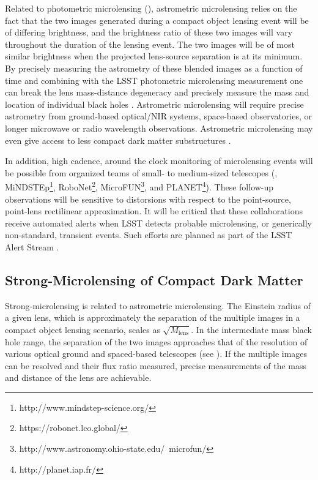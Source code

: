 Related to photometric microlensing (), astrometric microlensing relies on the fact that the two images generated during a compact object lensing event will be of differing brightness, and the brightness ratio of these two images will vary throughout the duration of the lensing event.
The two images will be of most similar brightness when the projected lens-source separation is at its minimum.
By precisely measuring the astrometry of these blended images as a function of time and combining with the LSST photometric microlensing measurement one can break the lens mass-distance degeneracy and precisely measure the mass and location of individual black holes \citep{2015ApJ...814L..11Y}.
Astrometric microlensing will require precise astrometry from ground-based optical/NIR systems, space-based observatories, or longer microwave or radio wavelength observations.
Astrometric microlensing may even give access to less compact dark matter substructures \citep{1804.01991}.

In addition, high cadence, around the clock monitoring of microlensing events will be possible from organized teams of small- to medium-sized telescopes (\eg, MiNDSTEp\footnote{http://www.mindstep-science.org/}, RoboNet\footnote{https://robonet.lco.global/}, MicroFUN\footnote{http://www.astronomy.ohio-state.edu/~microfun/}, and PLANET\footnote{http://planet.iap.fr/}). 
These follow-up observations will be sensitive to distorsions with respect to the point-source, point-lens rectilinear approximation.
It will be critical that these collaborations receive automated alerts when LSST detects probable microlensing, or generically non-standard, transient events. 
Such efforts are planned as part of the LSST Alert Stream \citep{0805.2366}.


\subsection{Strong-Microlensing of Compact Dark Matter }
Strong-microlensing is related to astrometric microlensing.
The Einstein radius of a given lens, which is approximately the separation of the multiple images in a compact object lensing scenario, scales as $\sqrt{M_\mathrm{lens}}$.
In the intermediate mass black hole range, the separation of the two images approaches that of the resolution of various optical ground and spaced-based telescopes (see ).
If the multiple images can be resolved and their flux ratio measured, precise measurements of the mass and distance of the lens are achievable.

